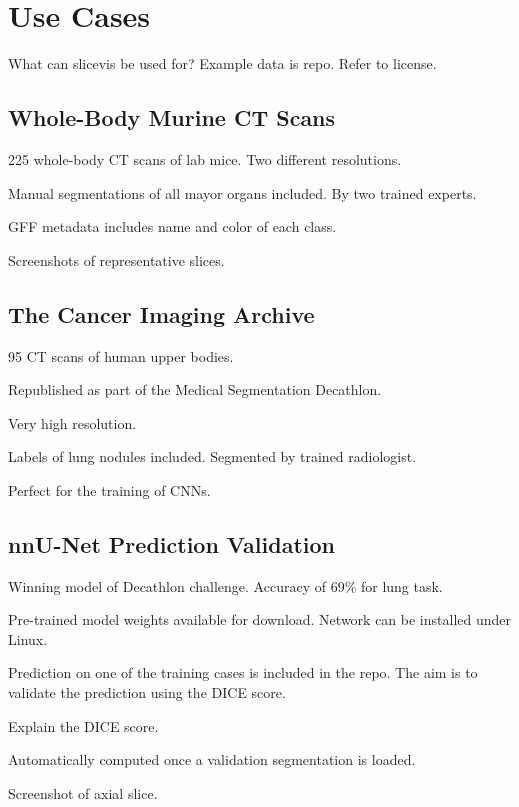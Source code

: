 \chapter{Use Cases}

What can slicevis be used for? Example data is repo. Refer to license. 

\section{Whole-Body Murine CT Scans}

225 whole-body CT scans of lab mice. Two different resolutions.

Manual segmentations of all mayor organs included. By two trained experts.

GFF metadata includes name and color of each class. 

Screenshots of representative slices.

\section{The Cancer Imaging Archive}

95 CT scans of human upper bodies.

Republished as part of the Medical Segmentation Decathlon.

Very high resolution.

Labels of lung nodules included. Segmented by trained radiologist. 

Perfect for the training of CNNs.

\section{nnU-Net Prediction Validation}

Winning model of Decathlon challenge. Accuracy of 69\% for lung task.

Pre-trained model weights available for download. Network can be installed under Linux.

Prediction on one of the training cases is included in the repo. The aim is to validate the prediction using the DICE score.

Explain the DICE score. 

Automatically computed once a validation segmentation is loaded.

Screenshot of axial slice.